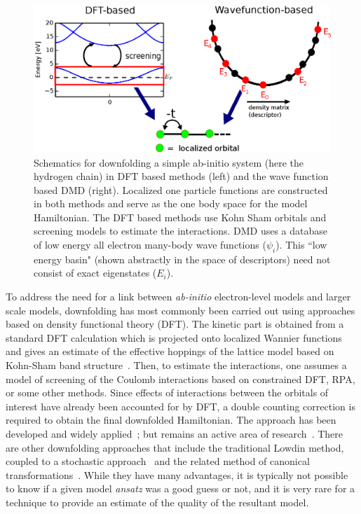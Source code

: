 \begin{figure}
\centering
\includegraphics[width=1\linewidth]{./Figures/figure1.eps}
\caption{Schematics for downfolding a simple ab-initio system (here the hydrogen chain) in DFT based methods (left) and the wave function based DMD (right). 
Localized one particle functions are constructed in both methods and serve as the one body space for the model Hamiltonian. 
The DFT based methods use Kohn Sham orbitals and screening models to estimate the interactions. 
DMD uses a database of low energy all electron many-body wave functions ($\psi_i$). 
This ``low energy basin" (shown abstractly in the space of descriptors) need not consist of exact eigenstates ($E_i$).}
\label{fig:lowenergybasin_schematic}
\end{figure}	

To address the need for a link between {\it ab-initio} electron-level models and larger scale models, downfolding has most commonly been carried out using approaches based on density functional theory (DFT). 
The kinetic part is obtained from a standard DFT calculation which is projected onto localized Wannier functions and gives an estimate of the effective hoppings of the lattice model based on  Kohn-Sham band structure~\cite{Pavirini}. 
Then, to estimate the interactions, one assumes a model of screening of the Coulomb interactions based on constrained DFT, RPA, or some other methods. 
Since effects of interactions between the orbitals of interest have already been accounted for by DFT, a double counting correction is required to obtain the final downfolded Hamiltonian. 
The approach has been developed and widely applied~\cite{Pavirini, Dasgupta, Aryasetiawan2004, Jeschke2013}; but remains an active area of research~\cite{Haule_doublecounting}.
There are other downfolding approaches that include the traditional Lowdin method, coupled to a stochastic approach~\cite{Tenno,Zhou_Ceperley} and the related method of canonical transformations~\cite{White_CT, Yanai_CT}. 
While they have many advantages, it is typically not possible to know if a given model {\it ansatz} was a good guess or not, and it is very rare for a technique to provide an estimate of the quality of the resultant model. 

